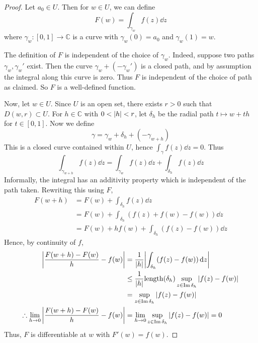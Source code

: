 \begin{proof}
	Let \( a_0 \in U \).
	Then for \( w \in U \), we can define
	\[
		F(w) = \int_{\gamma_w} f(z) \dd{z}
	\]
	where \( \gamma_w \colon [0,1] \to \mathbb C \) is a curve with \( \gamma_w(0) = a_0 \) and \( \gamma_w(1) = w \).

	The definition of \( F \) is independent of the choice of \( \gamma_w \).
	Indeed, suppose two paths \( \gamma_w, \gamma_w' \) exist.
	Then the curve \( \gamma_w + (-\gamma_w') \) is a closed path, and by assumption the integral along this curve is zero.
	Thus \( F \) is independent of the choice of path as claimed.
	So \( F \) is a well-defined function.

	Now, let \( w \in U \).
	Since \( U \) is an open set, there exists \( r > 0 \) such that \( D(w,r) \subset U \).
	For \( h \in \mathbb C \) with \( 0 < \abs{h} < r \), let \( \delta_h \) be the radial path \( t \mapsto w + th \) for \( t \in [0,1] \).
	Now we define
	\[
		\gamma = \gamma_w + \delta_h + (-\gamma_{w+h})
	\]
	This is a closed curve contained within \( U \), hence \( \int_\gamma f(z) \dd{z} = 0 \).
	Thus
	\[
		\int_{\gamma_{w+h}} f(z) \dd{z} = \int_{\gamma_w} f(z) \dd{z} + \int_{\delta_h} f(z) \dd{z}
	\]
	Informally, the integral has an additivity property which is independent of the path taken.
	Rewriting this using \( F \),
	\begin{align*}
		F(w+h) & = F(w) + \int_{\delta_h} f(z) \dd{z}                  \\
		       & = F(w) + \int_{\delta_h} (f(z) + f(w) - f(w)) \dd{z}  \\
		       & = F(w) + hf(w) + \int_{\delta_h} (f(z) - f(w)) \dd{z}
	\end{align*}
	Hence, by continuity of \( f \),
	\begin{align*}
		\abs{\frac{F(w+h) - F(w)}{h} - f(w)}                           & = \frac{1}{\abs{h}} \abs{\int_{\delta_h} (f(z) - f(w)) \dd{z}}                               \\
		                                                               & \leq \frac{1}{\abs{h}} \mathrm{length}(\delta_h) \sup_{z \in \Im \delta_h} \abs{f(z) - f(w)} \\
		                                                               & = \sup_{z \in \Im \delta_h} \abs{f(z) - f(w)}                                                \\
		\therefore \lim_{h \to 0} \abs{\frac{F(w+h) - F(w)}{h} - f(w)} & = \lim_{h \to 0} \sup_{z \in \Im \delta_h} \abs{f(z) - f(w)} = 0
	\end{align*}
	Thus, \( F \) is differentiable at \( w \) with \( F'(w) = f(w) \).
\end{proof}

